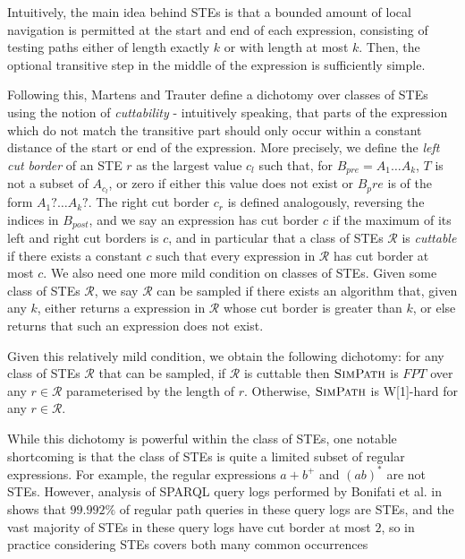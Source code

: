 \documentclass{article}
\begin{document}
Intuitively, the main idea behind STEs is that a bounded amount of local navigation is permitted at the start and end of each expression, consisting of testing paths either of length exactly $k$ or with length at most $k$. Then, the optional transitive step in the middle of the expression is sufficiently simple.

Following this, Martens and Trauter define a dichotomy over classes of STEs using the notion of \emph{cuttability} - intuitively speaking, that parts of the expression which do not match the transitive part should only occur within a constant distance of the start or end of the expression. More precisely, we define the \emph{left cut border} of an STE $r$ as the largest value $c_l$ such that, for $B_{pre} = A_1 \dots A_k$, $T$ is not a subset of $A_{c_l}$, or zero if either this value does not exist or $B_pre$ is of the form $A_1 ? \dots A_k ?$. The right cut border $c_r$ is defined analogously, reversing the indices in $B_{post}$, and we say an expression has cut border $c$ if the maximum of its left and right cut borders is $c$, and in particular that a class of STEs $\mathcal{R}$ is \emph{cuttable} if there exists a constant $c$ such that every expression in $\mathcal{R}$ has cut border at most $c$. We also need one more mild condition on classes of STEs. Given some class of STEs $\mathcal{R}$, we say $\mathcal{R}$ can be sampled if there exists an algorithm that, given any $k$, either returns a expression in $\mathcal{R}$ whose cut border is greater than $k$, or else returns that such an expression does not exist.

Given this relatively mild condition, we obtain the following dichotomy: for any class of STEs $\mathcal{R}$ that can be sampled, if $\mathcal{R}$ is cuttable then $\textsc{SimPath}$ is $FPT$ over any $r \in \mathcal{R}$ parameterised by the length of $r$. Otherwise, $\textsc{SimPath}$ is W[1]-hard for any $r \in \mathcal{R}$.

While this dichotomy is powerful within the class of STEs, one notable shortcoming is that the class of STEs is quite a limited subset of regular expressions. For example, the regular expressions $a + b^+$ and $(ab)^*$ are not STEs. However, analysis of SPARQL query logs performed by Bonifati et al. in \cite{bonifatiAnalyticalStudyLarge2020} shows that $99.992\%$ of regular path queries in these query logs are STEs, and the vast majority of STEs in these query logs have cut border at most $2$, so in practice considering STEs covers both many common occurrences
\end{document}
